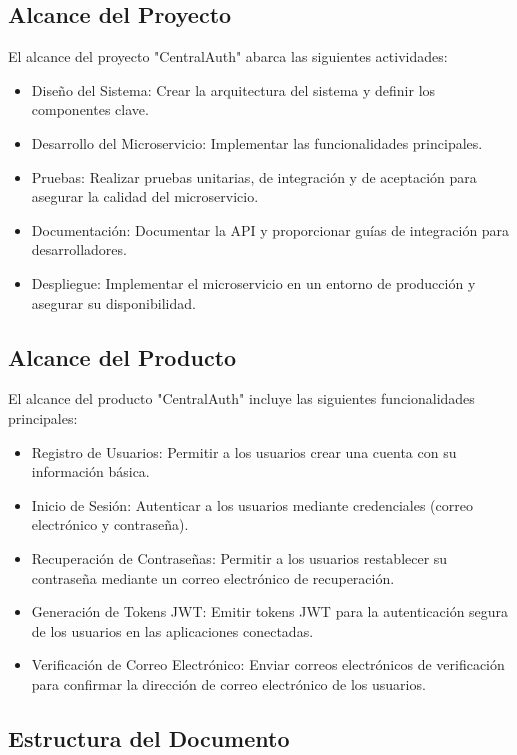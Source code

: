 \subsection{Alcance del Proyecto}

El alcance del proyecto "CentralAuth" abarca las siguientes actividades:
\begin{itemize}
    \item Diseño del Sistema: Crear la arquitectura del sistema y definir los componentes clave.
    \item Desarrollo del Microservicio: Implementar las funcionalidades principales.
    \item Pruebas: Realizar pruebas unitarias, de integración y de aceptación para asegurar la calidad del microservicio.
    \item Documentación: Documentar la API y proporcionar guías de integración para desarrolladores.
    \item Despliegue: Implementar el microservicio en un entorno de producción y asegurar su disponibilidad.
\end{itemize}

\subsection{Alcance del Producto}

El alcance del producto "CentralAuth" incluye las siguientes funcionalidades principales:
\begin{itemize}
    \item Registro de Usuarios: Permitir a los usuarios crear una cuenta con su información básica.
    \item Inicio de Sesión: Autenticar a los usuarios mediante credenciales (correo electrónico y contraseña).
    \item Recuperación de Contraseñas: Permitir a los usuarios restablecer su contraseña mediante un correo electrónico de recuperación.
    \item Generación de Tokens JWT: Emitir tokens JWT para la autenticación segura de los usuarios en las aplicaciones conectadas.
    \item Verificación de Correo Electrónico: Enviar correos electrónicos de verificación para confirmar la dirección de correo electrónico de los usuarios.
\end{itemize}

\subsection{Estructura del Documento}

